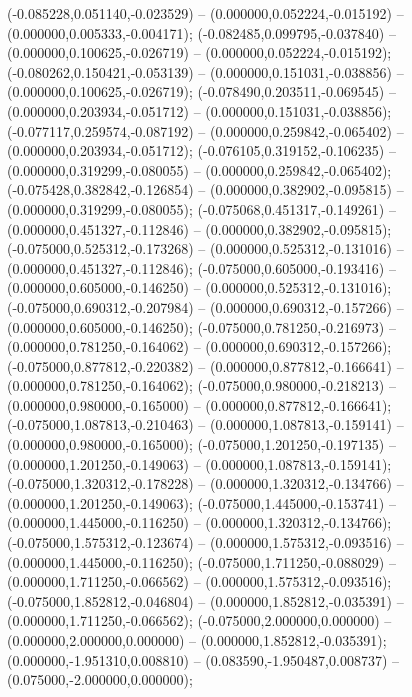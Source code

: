  (-0.085228,0.051140,-0.023529) -- (0.000000,0.052224,-0.015192) -- (0.000000,0.005333,-0.004171);
 (-0.082485,0.099795,-0.037840) -- (0.000000,0.100625,-0.026719) -- (0.000000,0.052224,-0.015192);
 (-0.080262,0.150421,-0.053139) -- (0.000000,0.151031,-0.038856) -- (0.000000,0.100625,-0.026719);
 (-0.078490,0.203511,-0.069545) -- (0.000000,0.203934,-0.051712) -- (0.000000,0.151031,-0.038856);
 (-0.077117,0.259574,-0.087192) -- (0.000000,0.259842,-0.065402) -- (0.000000,0.203934,-0.051712);
 (-0.076105,0.319152,-0.106235) -- (0.000000,0.319299,-0.080055) -- (0.000000,0.259842,-0.065402);
 (-0.075428,0.382842,-0.126854) -- (0.000000,0.382902,-0.095815) -- (0.000000,0.319299,-0.080055);
 (-0.075068,0.451317,-0.149261) -- (0.000000,0.451327,-0.112846) -- (0.000000,0.382902,-0.095815);
 (-0.075000,0.525312,-0.173268) -- (0.000000,0.525312,-0.131016) -- (0.000000,0.451327,-0.112846);
 (-0.075000,0.605000,-0.193416) -- (0.000000,0.605000,-0.146250) -- (0.000000,0.525312,-0.131016);
 (-0.075000,0.690312,-0.207984) -- (0.000000,0.690312,-0.157266) -- (0.000000,0.605000,-0.146250);
 (-0.075000,0.781250,-0.216973) -- (0.000000,0.781250,-0.164062) -- (0.000000,0.690312,-0.157266);
 (-0.075000,0.877812,-0.220382) -- (0.000000,0.877812,-0.166641) -- (0.000000,0.781250,-0.164062);
 (-0.075000,0.980000,-0.218213) -- (0.000000,0.980000,-0.165000) -- (0.000000,0.877812,-0.166641);
 (-0.075000,1.087813,-0.210463) -- (0.000000,1.087813,-0.159141) -- (0.000000,0.980000,-0.165000);
 (-0.075000,1.201250,-0.197135) -- (0.000000,1.201250,-0.149063) -- (0.000000,1.087813,-0.159141);
 (-0.075000,1.320312,-0.178228) -- (0.000000,1.320312,-0.134766) -- (0.000000,1.201250,-0.149063);
 (-0.075000,1.445000,-0.153741) -- (0.000000,1.445000,-0.116250) -- (0.000000,1.320312,-0.134766);
 (-0.075000,1.575312,-0.123674) -- (0.000000,1.575312,-0.093516) -- (0.000000,1.445000,-0.116250);
 (-0.075000,1.711250,-0.088029) -- (0.000000,1.711250,-0.066562) -- (0.000000,1.575312,-0.093516);
 (-0.075000,1.852812,-0.046804) -- (0.000000,1.852812,-0.035391) -- (0.000000,1.711250,-0.066562);
 (-0.075000,2.000000,0.000000) -- (0.000000,2.000000,0.000000) -- (0.000000,1.852812,-0.035391);
 (0.000000,-1.951310,0.008810) -- (0.083590,-1.950487,0.008737) -- (0.075000,-2.000000,0.000000);
